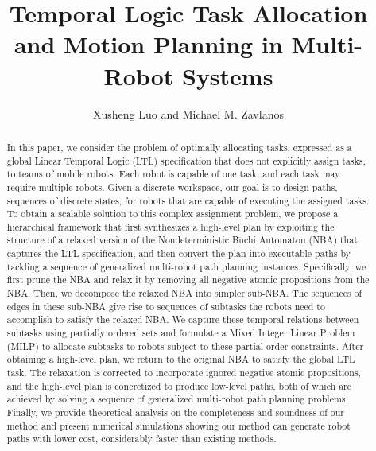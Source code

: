 \documentclass[Afour,sageh,times]{sagej}
\begin{document}

\author{Xusheng Luo and Michael M. Zavlanos}




\title{Temporal Logic Task Allocation and Motion Planning in Multi-Robot Systems}

\begin{abstract}
  In this paper, we consider the problem of optimally allocating tasks, expressed as a global Linear Temporal Logic (LTL) specification that does not explicitly assign tasks, to teams of mobile robots. Each robot is capable of one task, and each task may require multiple robots. Given a discrete workspace, our goal is to design paths, sequences of discrete states, for robots that are capable of executing the assigned tasks. To obtain a scalable solution to this complex assignment problem, we propose a hierarchical framework that first synthesizes a high-level plan by exploiting the structure of a relaxed version of the Nondeterministic B$\ddot{\text{u}}$chi Automaton (NBA) that captures the LTL specification, and then convert the plan into executable paths by tackling a sequence of generalized multi-robot path planning instances. Specifically, we first prune the NBA and relax it by removing all negative atomic propositions from the NBA. Then, we decompose the relaxed NBA into simpler sub-NBA. The sequences of edges in these sub-NBA give rise to sequences of subtasks  the robots need to accomplish to satisfy the relaxed NBA. We capture these temporal relations between subtasks using partially ordered sets and formulate a Mixed Integer Linear Problem (MILP) to allocate subtasks to robots subject to these partial order constraints. After obtaining a high-level plan, we return to the original NBA to satisfy the global LTL task. The relaxation is corrected to incorporate ignored negative atomic propositions, and the high-level plan is concretized to produce low-level paths, both of which are achieved by solving a sequence of generalized multi-robot path planning problems. Finally, we provide theoretical analysis on the completeness and soundness of our method and present numerical simulations showing our method can generate robot paths with lower cost, considerably faster than existing methods.

\end{abstract}
\end{document}
